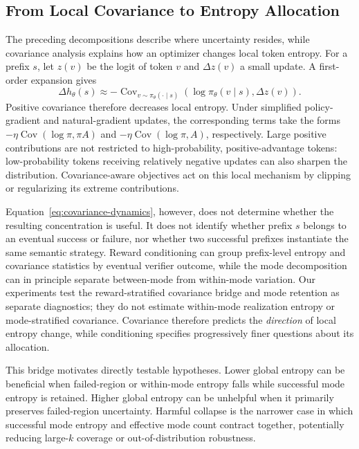 \documentclass[letterpaper]{article} %
\begin{document}
\subsection{From Local Covariance to Entropy Allocation}
The preceding decompositions describe where uncertainty resides, while covariance analysis explains how an optimizer changes local token entropy. For a prefix \(s\), let \(z(v)\) be the logit of token \(v\) and \(\Delta z(v)\) a small update. A first-order expansion gives \citep{cui2025entropy}
\begin{equation}
\Delta h_\theta(s)
\approx-\operatorname{Cov}_{v\sim\pi_\theta(\cdot\mid s)}
\left(\log\pi_\theta(v\mid s),\Delta z(v)\right).
\label{eq:covariance-dynamics}
\end{equation}
Positive covariance therefore decreases local entropy. Under simplified policy-gradient and natural-gradient updates, the corresponding terms take the forms
\(-\eta\operatorname{Cov}(\log\pi,\pi A)\) and
\(-\eta\operatorname{Cov}(\log\pi,A)\), respectively. Large positive contributions are not restricted to high-probability, positive-advantage tokens: low-probability tokens receiving relatively negative updates can also sharpen the distribution. Covariance-aware objectives act on this local mechanism by clipping or regularizing its extreme contributions.

Equation~\eqref{eq:covariance-dynamics}, however, does not determine whether the resulting concentration is useful. It does not identify whether prefix \(s\) belongs to an eventual success or failure, nor whether two successful prefixes instantiate the same semantic strategy. Reward conditioning can group prefix-level entropy and covariance statistics by eventual verifier outcome, while the mode decomposition can in principle separate between-mode from within-mode variation. Our experiments test the reward-stratified covariance bridge and mode retention as separate diagnostics; they do not estimate within-mode realization entropy or mode-stratified covariance. Covariance therefore predicts the \emph{direction} of local entropy change, while conditioning specifies progressively finer questions about its allocation.

This bridge motivates directly testable hypotheses. Lower global entropy can be beneficial when failed-region or within-mode entropy falls while successful mode entropy is retained. Higher global entropy can be unhelpful when it primarily preserves failed-region uncertainty. Harmful collapse is the narrower case in which successful mode entropy and effective mode count contract together, potentially reducing large-\(k\) coverage or out-of-distribution robustness.
\end{document}
